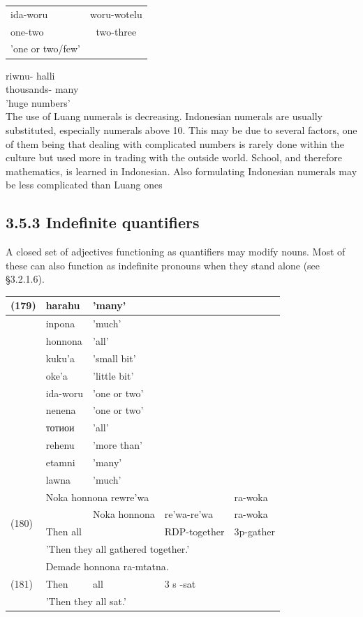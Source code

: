 \documentclass[10pt]{article}
\begin{document}
\begin{center}
\begin{tabular}{lc}
ida-woru & woru-wotelu \\
one-two & two-three \\
'one or two/few' &  \\
\end{tabular}
\end{center}

riwnu- halli\\
thousands- many\\
'huge numbers'\\
The use of Luang numerals is decreasing. Indonesian numerals are usually substituted, especially numerals above 10. This may be due to several factors, one of them being that dealing with complicated numbers is rarely done within the culture but used more in trading with the outside world. School, and therefore mathematics, is learned in Indonesian. Also formulating Indonesian numerals may be less complicated than Luang ones

\subsection*{3.5.3 Indefinite quantifiers}
A closed set of adjectives functioning as quantifiers may modify nouns. Most of these can also function as indefinite pronouns when they stand alone (see §3.2.1.6).

\begin{center}
\begin{tabular}{|l|l|l|l|l|}
\hline
\multirow[t]{11}{*}{(179)} & harahu & 'many' &  &  \\
\hline
 & inpona & 'much' &  &  \\
\hline
 & honnona & 'all' &  &  \\
\hline
 & kuku'a & 'small bit' &  &  \\
\hline
 & oke'a & 'little bit' &  &  \\
\hline
 & ida-woru & 'one or two' &  &  \\
\hline
 & nenena & 'one or two' &  &  \\
\hline
 & тотиои & 'all' &  &  \\
\hline
 & rehenu & 'more than' &  &  \\
\hline
 & etamni & 'many' &  &  \\
\hline
 & lawna & 'much' &  &  \\
\hline
\multirow[t]{4}{*}{(180)} & \multicolumn{3}{|l|}{Noka honnona rewre'wa} & ra-woka \\
\hline
 &  & Noka honnona & re'wa-re'wa & ra-woka \\
\hline
 & Then all &  & RDP-together & 3p-gather \\
\hline
 & \multicolumn{4}{|l|}{'Then they all gathered together.'} \\
\hline
\multirow[t]{3}{*}{(181)} & \multicolumn{4}{|l|}{Demade honnona ra-mtatna.} \\
\hline
 & Then & all & 3 s -sat &  \\
\hline
 & \multicolumn{4}{|l|}{'Then they all sat.'} \\
\hline
\end{tabular}
\end{center}
\end{document}
